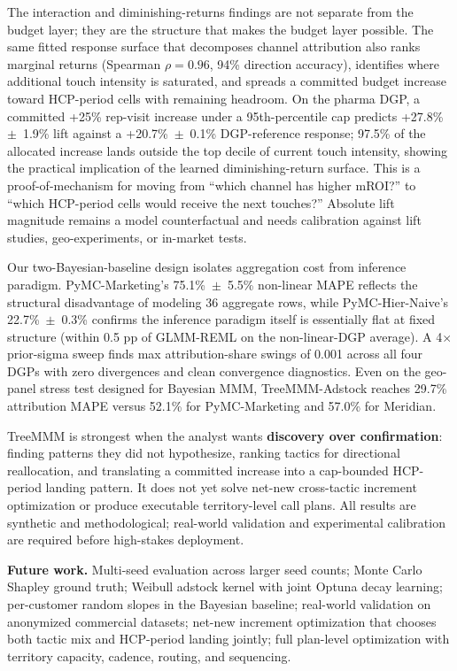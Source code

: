\documentclass[review,12pt]{elsarticle}
\begin{document}
The interaction and diminishing-returns findings are not separate from the
budget layer; they are the structure that makes the budget layer possible. The
same fitted response surface that decomposes channel attribution also ranks
marginal returns (Spearman $\rho = 0.96$, 94\% direction accuracy), identifies
where additional touch intensity is saturated, and spreads a committed budget
increase toward HCP-period cells with remaining headroom. On the pharma DGP, a
committed +25\% rep-visit increase under a 95th-percentile cap predicts
+27.8\%~$\pm$~1.9\% lift against a +20.7\%~$\pm$~0.1\% DGP-reference response;
97.5\% of the allocated increase lands outside the top decile of current touch
intensity, showing the practical implication of the learned diminishing-return
surface. This is a proof-of-mechanism for moving from ``which channel has
higher mROI?'' to ``which HCP-period cells would receive the next touches?''
Absolute lift magnitude remains a model counterfactual and needs calibration
against lift studies, geo-experiments, or in-market tests.

Our two-Bayesian-baseline design isolates aggregation cost from inference
paradigm. PyMC-Marketing's 75.1\%~$\pm$~5.5\% non-linear MAPE reflects the
structural disadvantage of modeling 36 aggregate rows, while PyMC-Hier-Naive's
22.7\%~$\pm$~0.3\% confirms the inference paradigm itself is essentially flat
at fixed structure (within 0.5 pp of GLMM-REML on the non-linear-DGP average).
A 4$\times$ prior-sigma sweep finds max attribution-share swings of 0.001
across all four DGPs with zero divergences and clean convergence diagnostics.
Even on the geo-panel stress test designed for Bayesian MMM, TreeMMM-Adstock
reaches 29.7\% attribution MAPE versus 52.1\% for PyMC-Marketing and 57.0\%
for Meridian.

TreeMMM is strongest when the analyst wants \textbf{discovery over
confirmation}: finding patterns they did not hypothesize, ranking tactics for
directional reallocation, and translating a committed increase into a
cap-bounded HCP-period landing pattern. It does not yet solve net-new
cross-tactic increment optimization or produce executable territory-level call
plans. All results are synthetic and methodological; real-world validation and
experimental calibration are required before high-stakes deployment.

\textbf{Future work.} Multi-seed evaluation across larger seed counts; Monte
Carlo Shapley ground truth; Weibull adstock kernel with joint Optuna decay
learning; per-customer random slopes in the Bayesian baseline; real-world
validation on anonymized commercial datasets; net-new increment optimization
that chooses both tactic mix and HCP-period landing jointly; full plan-level
optimization with territory capacity, cadence, routing, and sequencing.
\end{document}
